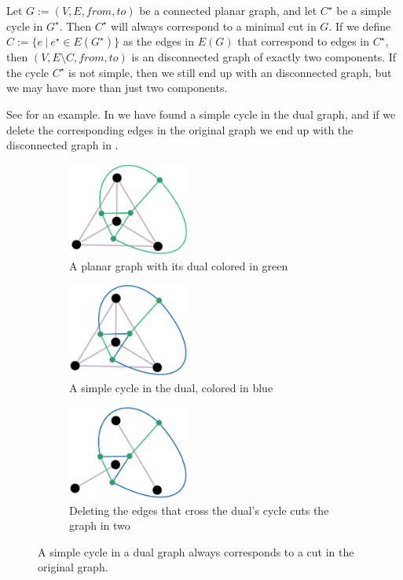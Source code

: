 \begin{fact}
\label{fact:dual-cycle-is-real-cut}
    Let $G := (V, E, from, to)$ be a connected planar graph, and let $C^\star$ be a simple cycle in $G^\star$. Then $C^\star$ will always correspond to a minimal cut in $G$. If we define $C := \{e ~ | ~ e^\star \in E(G^\star)\}$ as the edges in $E(G)$ that correspond to edges in $C^\star$, then $(V,E \setminus C, from, to)$ is an disconnected graph of exactly two components. If the cycle $C^\star$ is not simple, then we still end up with an disconnected graph, but we may have more than just two components.

    See  for an example. In  we have found a simple cycle in the dual graph, and if we delete the corresponding edges in the original graph we end up with the disconnected graph in .
\end{fact}

\begin{figure}[h]
    \centering
    \begin{subfigure}{.3\textwidth}
        \centering
        \includegraphics[width=4cm]{figures/duality/k4 with dual.png}
        \caption{A planar graph with its dual colored in green}
        \label{subfigure:k4-with-dual}
    \end{subfigure}\hfill%
    \begin{subfigure}{.3\textwidth}
        \centering
        \includegraphics[width=4cm]{figures/duality/dual with cycle.png}
        \caption{A simple cycle in the dual, colored in blue}
        \label{figure:dual-with-cycle}
    \end{subfigure}\hfill%
    \begin{subfigure}{.3\textwidth}
        \centering
        \includegraphics[width=4cm]{figures/duality/k4 cut in pieces.png}
        \caption{Deleting the edges that cross the dual's cycle cuts the graph in two}
        \label{subfigure:k4-cut}
    \end{subfigure}
    \caption{A simple cycle in a dual graph always corresponds to a cut in the original graph.}
    \label{figure:cycle-cut}
\end{figure}

